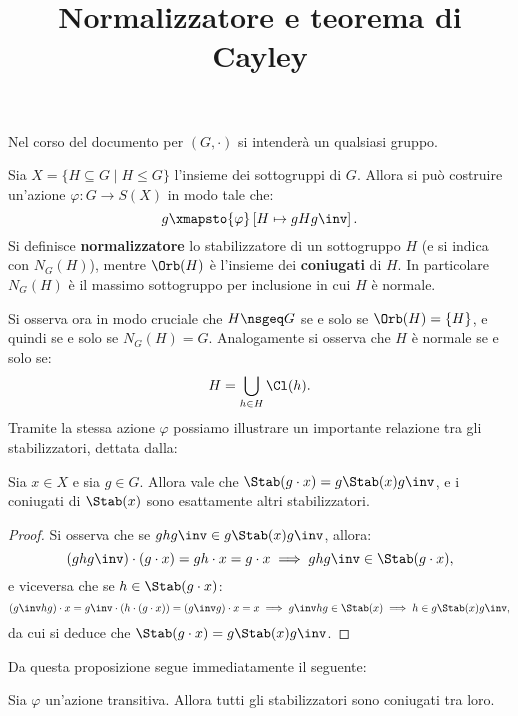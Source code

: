 \documentclass[12pt]{scrartcl}
\begin{document}
	\title{Normalizzatore e teorema di Cayley}
	\maketitle
	
	\begin{note}
		Nel corso del documento per $(G, \cdot)$ si intenderà un qualsiasi gruppo.
	\end{note}
	
	Sia $X = \{ H \subseteq G \mid H \leq G \}$ l'insieme dei sottogruppi di $G$.
	Allora si può costruire un'azione $\varphi : G \to S(X)$ in modo tale che:
	\[ g \xmapsto{\varphi} \left[ H \mapsto gHg\inv \right]. \]
	Si definisce \textbf{normalizzatore} lo stabilizzatore di un sottogruppo
	$H$ (e si indica con $N_G(H)$), mentre $\Orb(H)$ è l'insieme dei \textbf{coniugati}
	di $H$. In particolare $N_G(H)$ è il massimo sottogruppo per inclusione in cui $H$
	è normale. \medskip
	
	
	Si osserva ora in modo cruciale che $H \nsgeq G$ se e solo se
	$\Orb(H) = \{H\}$, e quindi se e solo se $N_G(H) = G$. Analogamente si
	osserva che $H$ è normale se e solo se:
	\[ H = \bigcup_{h \in H} \Cl(h). \]
	Tramite la stessa azione $\varphi$ possiamo illustrare un importante relazione
	tra gli stabilizzatori, dettata dalla:
	
	\begin{proposition}
		Sia $x \in X$ e sia $g \in G$. Allora vale che $\Stab(g \cdot x) = g \Stab(x) g\inv$,
		e i coniugati di $\Stab(x)$ sono esattamente altri stabilizzatori.
	\end{proposition}
	
	\begin{proof}
		Si osserva che se $ghg\inv \in g\Stab(x)g\inv$, allora:
		\[ (ghg\inv) \cdot (g \cdot x) = gh \cdot x = g \cdot x \implies ghg\inv \in \Stab(g \cdot x), \]
		e viceversa che se $h \in \Stab(g \cdot x)$:
		\[ (g\inv h g) \cdot x = g\inv \cdot (h \cdot (g \cdot x)) = (g\inv g) \cdot x = x \implies g\inv h g \in \Stab(x) \implies h \in g \Stab(x) g\inv, \]
		da cui si deduce che $\Stab(g \cdot x) = g \Stab(x) g\inv$.
	\end{proof}
	
	Da questa proposizione segue immediatamente il seguente:
	
	\begin{corollary}
		Sia $\varphi$ un'azione transitiva. Allora tutti gli stabilizzatori sono
		coniugati tra loro.
	\end{corollary}
	
\end{document}
